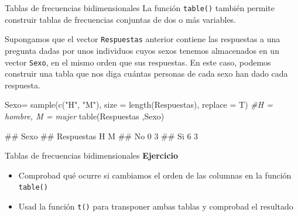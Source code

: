 \documentclass[
  ignorenonframetext,
  aspectratio=169]{beamer}
\newenvironment{Shaded}{\begin{snugshade}}{\end{snugshade}}
\newcommand{\AttributeTok}[1]{\textcolor[rgb]{0.77,0.63,0.00}{#1}}
\newcommand{\CommentTok}[1]{\textcolor[rgb]{0.56,0.35,0.01}{\textit{#1}}}
\newcommand{\FunctionTok}[1]{\textcolor[rgb]{0.00,0.00,0.00}{#1}}
\newcommand{\NormalTok}[1]{#1}
\newcommand{\OtherTok}[1]{\textcolor[rgb]{0.56,0.35,0.01}{#1}}
\newcommand{\StringTok}[1]{\textcolor[rgb]{0.31,0.60,0.02}{#1}}
\providecommand{\tightlist}{%
  \setlength{\itemsep}{0pt}\setlength{\parskip}{0pt}}
\let\oldverbatim\verbatim
\let\endoldverbatim\endverbatim
\renewenvironment{verbatim}{\tiny\oldverbatim}{\endoldverbatim}
\begin{document}
\begin{frame}[fragile]{Tablas de frecuencias bidimensionales}
\protect\hypertarget{tablas-de-frecuencias-bidimensionales}{}
La función \texttt{table()} también permite construir tablas de
frecuencias conjuntas de dos o más variables.

Supongamos que el vector \texttt{Respuestas} anterior contiene las
respuestas a una pregunta dadas por unos individuos cuyos sexos tenemos
almacenados en un vector \texttt{Sexo}, en el mismo orden que sus
respuestas. En este caso, podemos construir una tabla que nos diga
cuántas personas de cada sexo han dado cada respuesta.

\begin{Shaded}
\begin{Highlighting}[]
\NormalTok{Sexo}\OtherTok{=} \FunctionTok{sample}\NormalTok{(}\FunctionTok{c}\NormalTok{(}\StringTok{"H"}\NormalTok{, }\StringTok{"M"}\NormalTok{), }\AttributeTok{size =} \FunctionTok{length}\NormalTok{(Respuestas), }
             \AttributeTok{replace =}\NormalTok{ T) }\CommentTok{\#H = hombre, M = mujer}
\FunctionTok{table}\NormalTok{(Respuestas ,Sexo)}
\end{Highlighting}
\end{Shaded}

\begin{verbatim}
##           Sexo
## Respuestas H M
##         No 0 3
##         Si 6 3
\end{verbatim}
\end{frame}

\begin{frame}[fragile]{Tablas de frecuencias bidimensionales}
\protect\hypertarget{tablas-de-frecuencias-bidimensionales-1}{}
\textbf{Ejercicio}

\begin{itemize}
\tightlist
\item
  Comprobad qué ocurre si cambiamos el orden de las columnas en la
  función \texttt{table()}
\item
  Usad la función \texttt{t()} para transponer ambas tablas y comprobad
  el resultado
\end{itemize}
\end{frame}
\end{document}
